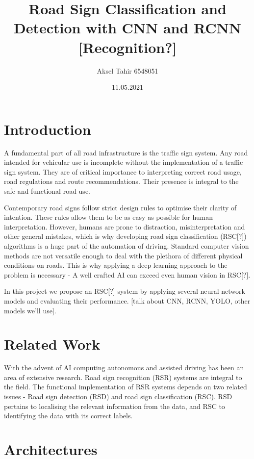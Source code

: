 \documentclass[12pt]{article}
\title{Road Sign Classification and Detection with CNN and RCNN [Recognition?]}
\author{Aksel Tahir 6548051}
\date{11.05.2021}
\begin{document}
\maketitle

\tableofcontents

\section{Introduction}

A fundamental part of all road infrastructure is the traffic sign system. Any
road intended for vehicular use is incomplete without the implementation of a
traffic sign system. They are of critical importance to interpreting correct
road usage, road regulations and route recommendations. Their presence is
integral to the safe and functional road use.

Contemporary road signs follow strict design rules to optimise their clarity of
intention. These rules allow them to be as easy as possible for human
interpretation. However, humans are prone to distraction, misinterpretation and
other general mistakes, which is why developing road sign classification
(RSC[?]) algorithms is a huge part of the automation of driving. Standard
computer vision methods are not versatile enough to deal with the plethora of
different physical conditions on roads. This is why applying a deep learning
approach to the problem is necessary - A well crafted AI can exceed even human
vision in RSC[?].

In this project we propose an RSC[?] system by applying several neural network
models and evaluating their performance. [talk about CNN, RCNN, YOLO, other
models we'll use].


\section{Related Work}
With the advent of AI computing autonomous and assisted driving has been an area
of extensive research. Road sign recognition (RSR) systems are integral to the
field. The functional implementation of RSR systems depends on two related
issues - Road sign detection (RSD) and road sign classification (RSC). RSD
pertains to localising the relevant information from the data, and RSC to
identifying the data with its correct labels.
\cite{1} 

\section{Architectures}
\end{document}
